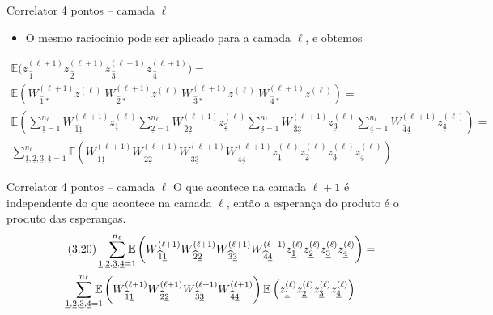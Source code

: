 \documentclass{beamer}
\newcommand{\EE}{\mathbb{E}}
\def\mi#1{{\,\widehat{#1}}}
\def\mj#1{\underline{#1}}
\def\eell{{(\ell)}}
\def\eellum{{(\ell+1)}}
\begin{document}
\begin{frame}{Correlator 4 pontos -- camada $\ell$}
	\begin{itemize}
		\item O mesmo raciocínio pode ser aplicado para a camada $\ell$, e obtemos
	\end{itemize}\small
	\begin{multline*}\tag{3.20}
		\EE\big(z^\eellum_{\mi1} z^\eellum_{\mi2} z^\eellum_{\mi3} z^\eellum_{\mi4}\big) = \\
		\EE\left(W^\eellum_{\mi1*}z^\eell \ W^\eellum_{\mi2*}z^\eell \ W^\eellum_{\mi3*}z^\eell \ W^\eellum_{\mi4*}z^\eell \right) = \\
		\EE\left(\sum_{\mj1=1}^{n_\ell}\! W^\eellum_{\mi1\mj1}z^\eell_{\mj1} \sum_{\mj2=1}^{n_\ell}\! W^\eellum_{\mi2\mj2}z^\eell_{\mj2} 
		\sum_{\mj3=1}^{n_\ell}\! W^\eellum_{\mi3\mj3}z^\eell_{\mj3}  \sum_{\mj4=1}^{n_\ell} \! W^\eellum_{\mi4\mj4}z^\eell_{\mj4} \right) = \\
		\sum_{\mj1,\mj2,\mj3,\mj4=1}^{n_\ell}\! \EE\left(W^\eellum_{\mi1\mj1}W^\eellum_{\mi2\mj2}W^\eellum_{\mi3\mj3}W^\eellum_{\mi4\mj4} z^\eell_{\mj1}z^\eell_{\mj2}z^\eell_{\mj3}z^\eell_{\mj4}\right)
	\end{multline*}
\end{frame}

\begin{frame}{Correlator 4 pontos -- camada $\ell$}
	O que acontece na camada $\ell+1$ é independente do que acontece na camada $\ell$, então a esperança do produto é o produto das esperanças.
	\begin{multline*}\tag{3.20}
		\sum_{\mj1,\mj2,\mj3,\mj4=1}^{n_\ell}\hspace{-2ex}\EE\left(W^\eellum_{\mi1\mj1}W^\eellum_{\mi2\mj2}W^\eellum_{\mi3\mj3}W^\eellum_{\mi4\mj4} z^\eell_{\mj1}z^\eell_{\mj2}z^\eell_{\mj3}z^\eell_{\mj4}\right)
 = \\ \sum_{\mj1,\mj2,\mj3,\mj4=1}^{n_\ell}\hspace{-2ex}\EE\left(W^\eellum_{\mi1\mj1}W^\eellum_{\mi2\mj2}W^\eellum_{\mi3\mj3}W^\eellum_{\mi4\mj4} \right)\EE\left( z^\eell_{\mj1}z^\eell_{\mj2}z^\eell_{\mj3}z^\eell_{\mj4}\right)
	\end{multline*}
\end{frame}
\end{document}
